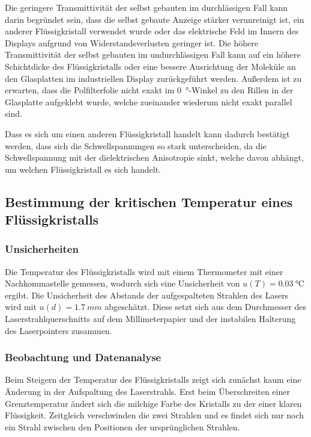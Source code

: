 \documentclass[
	a4paper,
	12pt,
	pagesize,
	ngerman
]{scrartcl}
\begin{document}
	Die geringere Transmittivität der selbst gebauten im durchlässigen Fall kann darin begründet sein, dass die selbst gebaute Anzeige stärker verunreinigt ist, ein anderer Flüssigkristall verwendet wurde oder das elektrische Feld im Innern des Displays aufgrund von Widerstandsverlusten geringer ist.
	Die höhere Transmittivität der selbst gebauten im undurchlässigen Fall kann auf ein höhere Schichtdicke des Flüssigkristalls oder eine bessere Ausrichtung der Moleküle an den Glasplatten im industriellen Display zurückgeführt werden.
	Außerdem ist zu erwarten, dass die Polfilterfolie nicht exakt im \SI{0}{\degree}-Winkel zu den Rillen in der Glasplatte aufgeklebt wurde, welche zueinander wiederum nicht exakt parallel sind.

	Dass es sich um einen anderen Flüssigkristall handelt kann dadurch bestätigt werden, dass sich die Schwellspannungen so stark unterscheiden, da die Schwellspannung mit der dielektrischen Anisotropie sinkt, welche davon abhängt, um welchen Flüssigkristall es sich handelt.

	\subsection{Bestimmung der kritischen Temperatur eines Flüssigkristalls}
	\subsubsection{Unsicherheiten}
	Die Temperatur des Flüssigkristalls wird mit einem Thermometer mit einer Nachkommastelle gemessen, wodurch sich eine Unsicherheit von $u(T)=\SI{0.03}{\celsius}$ ergibt.
	Die Unsicherheit des Abstands der aufgespalteten Strahlen des Lasers wird mit $u(d)=\SI{1.7}{mm}$ abgeschätzt.
	Diese setzt sich aus dem Durchmesser des Laserstrahlquerschnitts auf dem Millimeterpapier und der instabilen Halterung des Laserpointers zusammen.
	\subsubsection{Beobachtung und Datenanalyse}
	Beim Steigern der Temperatur des Flüssigkristalls zeigt sich zunächst kaum eine Änderung in der Aufspaltung des Laserstrahls.
	Erst beim Überschreiten einer Grenztemperatur ändert sich die milchige Farbe des Kristalls zu der einer klaren Flüssigkeit.
	Zeitgleich verschwinden die zwei Strahlen und es findet sich nur noch ein Strahl zwischen den Positionen der ursprünglichen Strahlen.
\end{document}
